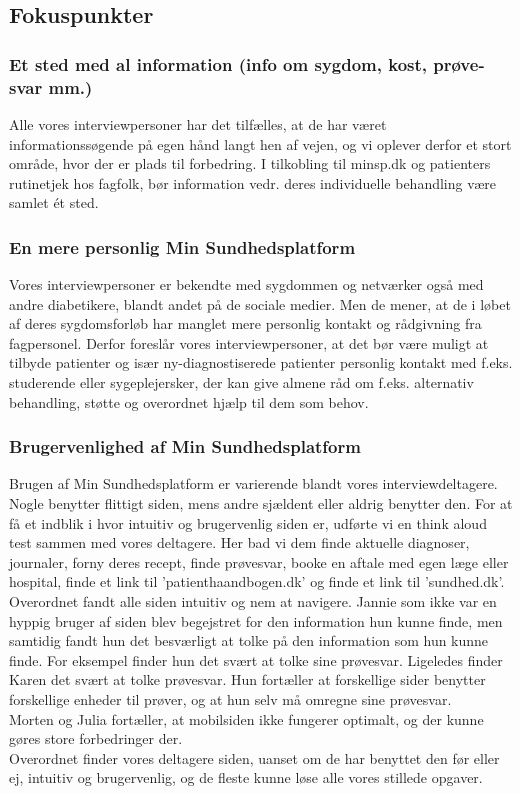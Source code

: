 \subsection{Fokuspunkter}
\subsubsection{Et sted med al information (info om sygdom, kost, prøve-svar mm.)}
Alle vores interviewpersoner har det tilfælles, at de har været informationssøgende på egen hånd langt hen af vejen, og vi oplever derfor et stort område, hvor der er plads til forbedring. I tilkobling til minsp.dk og patienters rutinetjek hos fagfolk, bør information vedr. deres individuelle behandling være samlet ét sted.

\subsubsection{En mere personlig Min Sundhedsplatform}
Vores interviewpersoner er bekendte med sygdommen og netværker også med andre diabetikere, blandt andet på de sociale medier. Men de mener, at de i løbet af deres sygdomsforløb har manglet mere personlig kontakt og rådgivning fra fagpersonel. Derfor foreslår vores interviewpersoner, at det bør være muligt at tilbyde patienter og især ny-diagnostiserede patienter personlig kontakt med f.eks. studerende eller sygeplejersker, der kan give almene råd om f.eks. alternativ behandling, støtte og overordnet hjælp til dem som behov.

\subsubsection{Brugervenlighed af Min Sundhedsplatform}
Brugen af Min Sundhedsplatform er varierende blandt vores interviewdeltagere. Nogle benytter flittigt siden, mens andre sjældent eller aldrig benytter den. For at få et indblik i hvor intuitiv og brugervenlig siden er, udførte vi en think aloud test sammen med vores deltagere. Her bad vi dem finde aktuelle diagnoser, journaler, forny deres recept, finde prøvesvar, booke en aftale med egen læge eller hospital, finde et link til 'patienthaandbogen.dk' og finde et link til 'sundhed.dk'. Overordnet fandt alle siden intuitiv og nem at navigere. Jannie som ikke var en hyppig bruger af siden blev begejstret for den information hun kunne finde, men samtidig fandt hun det besværligt at tolke på den information som hun kunne finde. For eksempel finder hun det svært at tolke sine prøvesvar. Ligeledes finder Karen det svært at tolke prøvesvar. Hun fortæller at forskellige sider benytter forskellige enheder til prøver, og at hun selv må omregne sine prøvesvar.\\
Morten og Julia fortæller, at mobilsiden ikke fungerer optimalt, og der kunne gøres store forbedringer der.\\
Overordnet finder vores deltagere siden, uanset om de har benyttet den før eller ej, intuitiv og brugervenlig, og de fleste kunne løse alle vores stillede opgaver.

